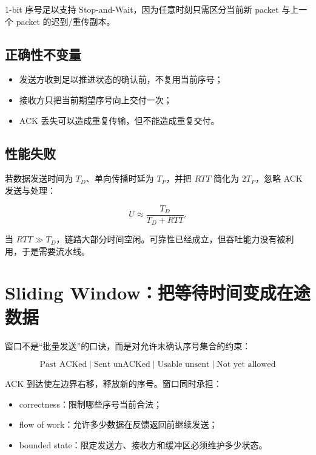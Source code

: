 \documentclass[UTF8,fontset=none,11pt,a4paper]{ctexart}
\providecommand{\tightlist}{\setlength{\itemsep}{0pt}\setlength{\parskip}{0pt}}
\begin{document}
1-bit 序号足以支持 Stop-and-Wait，因为任意时刻只需区分当前新 packet
与上一个 packet 的迟到/重传副本。

\subsection{正确性不变量}\label{31-ux6b63ux786eux6027ux4e0dux53d8ux91cf}

\begin{itemize}
\tightlist
\item
  发送方收到足以推进状态的确认前，不复用当前序号；
\item
  接收方只把当前期望序号向上交付一次；
\item
  ACK 丢失可以造成重复传输，但不能造成重复交付。
\end{itemize}

\subsection{性能失败}\label{32-ux6027ux80fdux5931ux8d25}

若数据发送时间为 \(T_D\)、单向传播时延为 \(T_P\)，并把 \(RTT\) 简化为
\(2T_P\)，忽略 ACK 发送与处理：

\[
U\approx\frac{T_D}{T_D+RTT}.
\]

当
\(RTT\gg T_D\)，链路大部分时间空闲。可靠性已经成立，但吞吐能力没有被利用，于是需要流水线。

\section{Sliding
Window：把等待时间变成在途数据}\label{4-sliding-windowux628aux7b49ux5f85ux65f6ux95f4ux53d8ux6210ux5728ux9014ux6570ux636e}

窗口不是``批量发送''的口诀，而是对允许未确认序号集合的约束：

\[
\boxed{
\text{Past ACKed}
\mid \text{Sent unACKed}
\mid \text{Usable unsent}
\mid \text{Not yet allowed}
}
\]

ACK 到达使左边界右移，释放新的序号。窗口同时承担：

\begin{itemize}
\tightlist
\item
  correctness：限制哪些序号当前合法；
\item
  flow of work：允许多少数据在反馈返回前继续发送；
\item
  bounded state：限定发送方、接收方和缓冲区必须维护多少状态。
\end{itemize}
\end{document}
